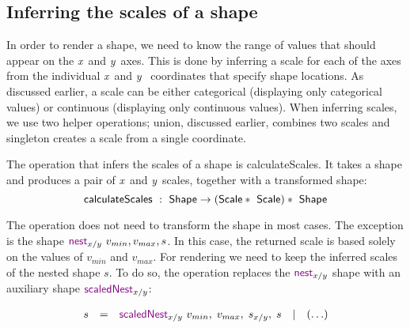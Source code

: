\documentclass{jfp}
\newcommand{\X}{\emph{x}\ }
\newcommand{\Y}{\emph{y}\ }
\newcommand{\ident}[1]{\textnormal{\textcolor{idclr}{\sffamily #1}}}
\newcommand{\kvd}[1]{\textnormal{\textcolor{kvdclr}{\sffamily #1}}}
\begin{document}
\subsection{Inferring the scales of a shape}
\label{sec:impl-infer}

In order to render a shape, we need to know the range of values that should appear on the \X and
\Y axes. This is done by inferring a scale for each of the axes from the individual \X and \Y
coordinates that specify shape locations. As discussed earlier, a scale can be either categorical
(displaying only categorical values) or continuous (displaying only continuous values). When
inferring scales, we use two helper operations; \ident{union}, discussed earlier, combines two
scales and \ident{singleton} creates a scale from a single coordinate.

The operation that infers the scales of a shape is \ident{calculateScales}. It takes a shape
and produces a pair of \X and \Y scales, together with a transformed shape:
%
\begin{equation*}
  \ident{calculateScales} ~:~ \ident{Shape} \rightarrow (\ident{Scale}*\ident{Scale}) * \ident{Shape}
\end{equation*}

\vspace{-1.25em}
\noindent
The operation does not need to transform the shape in most cases. The exception is the
shape $\kvd{nest}_{x/y}~v_{min}, v_{max}, s$. In this case, the returned scale is based solely on the
values of $v_{min}$ and $v_{max}$. For rendering we need to keep the inferred scales of the nested
shape $s$. To do so, the operation replaces the $\kvd{nest}_{x/y}$ shape with an auxiliary shape
$\kvd{scaledNest}_{x/y}$:

\begin{equation*}
\begin{array}{rclcl}
s &=& \kvd{scaledNest}_{x/y}~v_{min},\;v_{max},\;s_{x/y},\;s &|& (\ldots)
\end{array}
\end{equation*}
\end{document}
